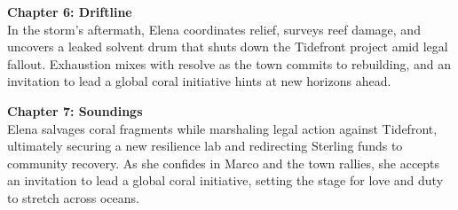 \medskip

\noindent\textbf{Chapter 6: Driftline}\\
In the storm's aftermath, Elena coordinates relief, surveys reef damage, and uncovers a leaked solvent drum that shuts down the Tidefront project amid legal fallout. Exhaustion mixes with resolve as the town commits to rebuilding, and an invitation to lead a global coral initiative hints at new horizons ahead.

\medskip

\noindent\textbf{Chapter 7: Soundings}\\
Elena salvages coral fragments while marshaling legal action against Tidefront, ultimately securing a new resilience lab and redirecting Sterling funds to community recovery. As she confides in Marco and the town rallies, she accepts an invitation to lead a global coral initiative, setting the stage for love and duty to stretch across oceans.
